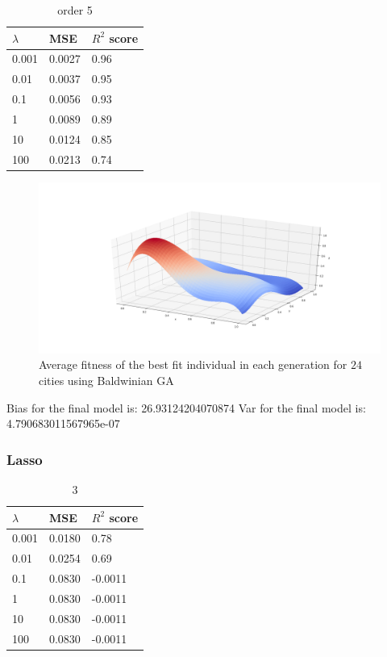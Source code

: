 \documentclass [11pt]{article}
\begin{document}
\begin{table}[H]
\centering
\begin{tabular}{lll}
\hline
$\lambda$ & MSE    & $R^{2}$ score \\ \hline
0.001     & 0.0027 & 0.96          \\
0.01      & 0.0037 & 0.95          \\
0.1       & 0.0056 & 0.93          \\
1         & 0.0089 & 0.89          \\
10        & 0.0124 & 0.85          \\
100       & 0.0213 & 0.74          \\ \hline
\end{tabular}
\caption{order 5}
\label{my-label}
\end{table}

\begin{figure}[H]
\centering
\includegraphics[width=1\textwidth]{figures/RidgeFranke.png}
        \caption{Average fitness of the best fit individual in each generation for $24$ cities using Baldwinian GA}
        \label{fig:RidgeFranke}
\end{figure}

Bias for the final model is: 26.93124204070874
Var for the final model is: 4.790683011567965e-07
\subsubsection{Lasso}

\begin{table}[H]
\centering
\begin{tabular}{lll}
\hline
$\lambda$ & MSE    & $R^{2}$ score \\ \hline
0.001     & 0.0180 & 0.78          \\
0.01      & 0.0254 & 0.69          \\
0.1       & 0.0830 & -0.0011       \\
1         & 0.0830 & -0.0011       \\
10        & 0.0830 & -0.0011       \\
100       & 0.0830 & -0.0011       \\ \hline
\end{tabular}
\caption{3}
\label{my-label}
\end{table}
\end{document}
